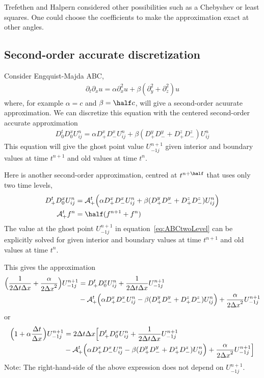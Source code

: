 Trefethen and Halpern considered other possibilities such as a Chebyshev or least squares.
One could choose the coefficients
to make the approximation exact at other angles.


\newcommand{\Dxp}{D^{x}_+}
\newcommand{\Dxm}{D^{x}_-}
\newcommand{\Dxz}{D^{x}_0}
\newcommand{\Dyp}{D^{y}_+}
\newcommand{\Dym}{D^{y}_-}
\newcommand{\Dyz}{D^{y}_0}
\newcommand{\Dzp}{D^{z}_+}
\newcommand{\Dzm}{D^{z}_-}
\newcommand{\Dzz}{D^{z}_0}
\newcommand{\Dtp}{D^{t}_+}
\newcommand{\Dtm}{D^{t}_-}
\newcommand{\Dtz}{D^{t}_0}
\newcommand{\Avtp}{\mathcal{A}^t_+}
\subsection{Second-order accurate discretization}


Consider Engquist-Majda ABC,
\begin{align}
   \partial_t\partial_x u = \alpha \partial_x^2 u + \beta (\partial_y^2+\partial_z^2) u 
\end{align}
where, for example $\alpha=c$ and $\beta=\half c$, will give a second-order acuurate approximation. 
We can discretize this equation with the centered second-order accurate approximation
\begin{align}
   \Dtz\Dxz U_{ij}^n = \alpha \Dxp\Dxm U_{ij}^n +\beta ( \Dyp\Dym + \Dzp\Dzm) U_{ij}^n 
\end{align}
This equation will give the ghost point value $U_{-1j}^{n+1}$ given interior and boundary values at time $t^{n+1}$
and old values at time $t^n$. 

Here is another second-order approximation, centred at $t^{n+\half}$ that uses only two time levels,
\begin{align}
   \Dtp\Dxz U_{ij}^n &= \Avtp\Big( \alpha\Dxp\Dxm U_{ij}^n +\beta( \Dyp\Dym + \Dzp\Dzm) U_{ij}^n\Big) \label{eq:ABCtwoLevel}  \\
   \Avtp f^n &= \half( f^{n+1} + f^n) 
\end{align}
The value at the ghost point $U_{-1j}^{n+1}$ in equation~\eqref{eq:ABCtwoLevel} 
can be explicitly solved for given interior and boundary values at time $t^{n+1}$
and old values at time $t^n$. 

This gives the approximation
\begin{align}
\Big({1\over 2\dt\dx} + {\alpha\over 2\dx^2}\Big) U_{-1j}^{n+1} &= 
  \Dtp\Dxz U_{ij}^n + {1\over 2\dt\dx}U_{-1j}^{n+1}  \\
           & - \Avtp\Big( \alpha \Dxp\Dxm U_{ij}^n - \beta ( \Dyp\Dym + \Dzp\Dzm) U_{ij}^n\Big)
    + {\alpha\over 2\dx^2} U_{-1j}^{n+1}
\end{align}
or
\begin{align}
\Big( 1 + \alpha\frac{\dt}{\dx}\Big) U_{-1j}^{n+1} &= 2\dt\dx\Big[ 
  \Dtp\Dxz U_{ij}^n + {1\over 2\dt\dx}U_{-1j}^{n+1}  \\
           & - \Avtp\Big( \alpha \Dxp\Dxm U_{ij}^n - \beta ( \Dyp\Dym + \Dzp\Dzm) U_{ij}^n\Big)
    + {\alpha\over 2\dx^2} U_{-1j}^{n+1} \Big]
\end{align}
Note: The right-hand-side of the above expression does not depend on $U_{-1j}^{n+1}$. 


